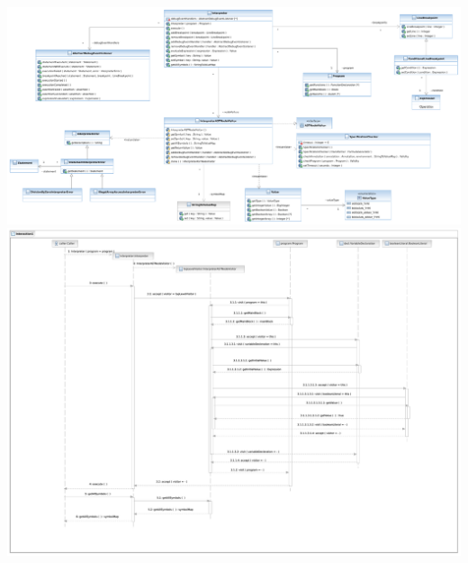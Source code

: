\includegraphics[angle=90,height=\textheight]{diagrams/interpreter_component.pdf}
\newpage
\includegraphics[angle=90,height=\textheight]{diagrams/interpreter_functioncall_sequence.pdf}
